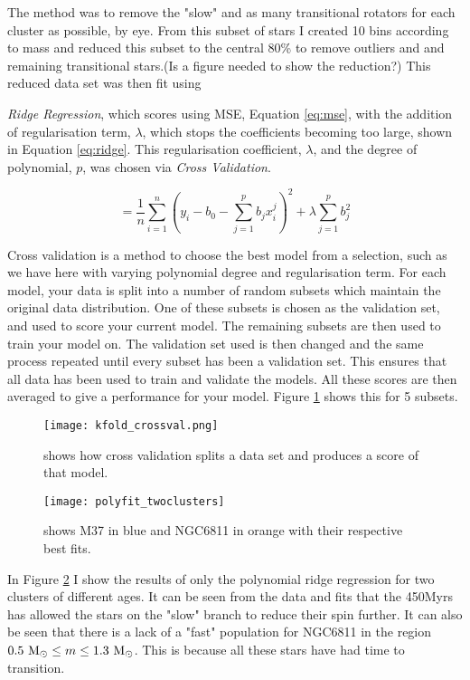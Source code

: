 \documentclass[fleqn,usenatbib]{mnras}
\begin{document}
The method was to remove the "slow" and as many transitional rotators for each cluster as possible, by eye.
From this subset of stars I created 10 bins according to mass and reduced this subset to the central 80\% to remove outliers and and remaining transitional stars.(Is a figure needed to show the reduction?)
This reduced data set was then fit using {\textit{Ridge Regression}, which scores using MSE, Equation \ref{eq:mse}, with the addition of regularisation term, $\lambda$, which stops the coefficients becoming too large, shown in Equation \ref{eq:ridge}.
This regularisation coefficient, $\lambda$, and the degree of polynomial, $p$, was chosen via \textit{Cross Validation}.

\begin{equation}
	\label{eq:ridge}
	 = \frac{1}{n}\sum_{i = 1}^n \left(y_i - b_0 - \sum_{j = 1}^p b_jx_i^j \right)^2 + \lambda \sum_{j = 1}^p b^2_j
\end{equation}

Cross validation is a method to choose the best model from a selection, such as we have here with varying polynomial degree and regularisation term.
For each model, your data is split into a number of random subsets which maintain the original data distribution.
One of these subsets is chosen as the validation set, and used to score your current model.
The remaining subsets are then used to train your model on.
The validation set used is then changed and the same process repeated until every subset has been a validation set.
This ensures that all data has been used to train and validate the models.
All these scores are then averaged to give a performance for your model.
Figure \ref{fig:cross_validation} shows this for 5 subsets.

\begin{figure}
	\texttt{[image: kfold\_crossval.png]}
	\caption{shows how cross validation splits a data set and produces a score of that model.}
	\label{fig:cross_validation}
\end{figure}



\begin{figure}
	\texttt{[image: polyfit\_twoclusters]}
	\caption{shows M37 in blue and NGC6811 in orange with their respective best fits.}
	\label{fig:polyfit_twoclusters}
\end{figure}

In Figure \ref{fig:polyfit_twoclusters} I show the results of only the polynomial ridge regression for two clusters of different ages.
It can be seen from the data and fits that the 450Myrs has allowed the stars on the "slow" branch to reduce their spin further.
It can also be seen that there is a lack of a "fast" population for NGC6811 in the region $0.5~\textup{M}_\odot \leq m \leq 1.3~\textup{M}_\odot$.
This is because all these stars have had time to transition.

}
\end{document}
